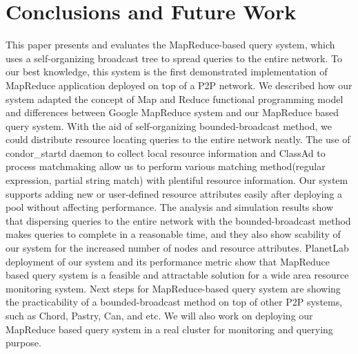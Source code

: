 \documentclass{acm_proc_article-sp}
\begin{document}
\section{Conclusions and Future Work}
This paper presents and evaluates the MapReduce-based query system, which uses a self-organizing broadcast tree to spread queries to the entire network.
To our best knowledge, this system is the first demonstrated implementation of MapReduce application deployed on top of a P2P network.
We described how our system adapted the concept of Map and Reduce functional programming model and differences between Google MapReduce system and our MapReduce based query system.
With the aid of self-organizing bounded-broadcast method, we could distribute resource locating queries to the entire network neatly. 
The use of condor\_startd daemon to collect local resource information and ClassAd to process matchmaking allow us to perform various matching method(regular expression, partial string match) with plentiful resource information.
Our system supports adding new or user-defined resource attributes easily after deploying a pool without affecting performance.
The analysis and simulation results show that dispersing queries to the entire network with the bounded-broadcast method makes queries to complete in a reasonable time, 
and they also show scability of our system for the increased number of nodes and resource attributes.
PlanetLab deployment of our system and its performance metric show that MapReduce based query system is a feasible and attractable solution for a wide area resource monitoring system.
Next steps for MapReduce-based query system are showing the practicability of a bounded-broadcast method on top of other P2P systems, such as Chord, Pastry, Can, and etc.
We will also work on deploying our MapReduce based query system in a real cluster for monitoring and querying purpose.


\balancecolumns
\end{document}
